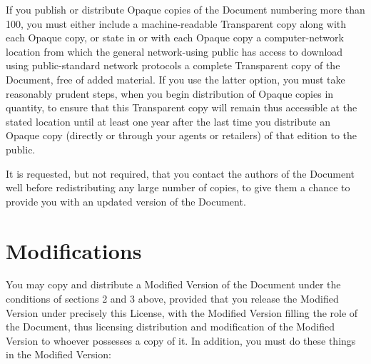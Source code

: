 \documentclass[a4paper,spanish,12pt]{book}
\begin{document}
If you publish or distribute Opaque copies of the Document numbering
more than 100, you must either include a machine-readable Transparent
copy along with each Opaque copy, or state in or with each Opaque copy
a computer-network location from which the general network-using
public has access to download using public-standard network protocols
a complete Transparent copy of the Document, free of added material.
If you use the latter option, you must take reasonably prudent steps,
when you begin distribution of Opaque copies in quantity, to ensure
that this Transparent copy will remain thus accessible at the stated
location until at least one year after the last time you distribute an
Opaque copy (directly or through your agents or retailers) of that
edition to the public.

It is requested, but not required, that you contact the authors of the
Document well before redistributing any large number of copies, to give
them a chance to provide you with an updated version of the Document.

\section{Modifications}

You may copy and distribute a Modified Version of the Document under
the conditions of sections 2 and 3 above, provided that you release
the Modified Version under precisely this License, with the Modified
Version filling the role of the Document, thus licensing distribution
and modification of the Modified Version to whoever possesses a copy
of it.  In addition, you must do these things in the Modified Version:
\end{document}
